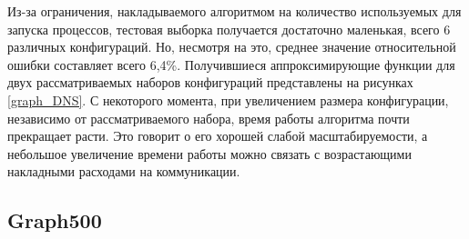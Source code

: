 			Из-за ограничения, накладываемого алгоритмом на количество используемых для запуска процессов, тестовая выборка получается достаточно маленькая, всего 6 различных конфигураций. Но, несмотря на это, среднее значение относительной ошибки составляет всего 6,4\%. Получившиеся аппроксимирующие функции для двух рассматриваемых наборов конфигураций представлены на рисунках \eqref{graph_DNS}. С некоторого момента, при увеличением размера конфигурации, независимо от рассматриваемого набора, время работы алгоритма почти прекращает расти. Это говорит о его хорошей слабой масштабируемости, а небольшое увеличение времени работы можно связать с возрастающими накладными расходами на коммуникации.

	\subsection{Graph500}
